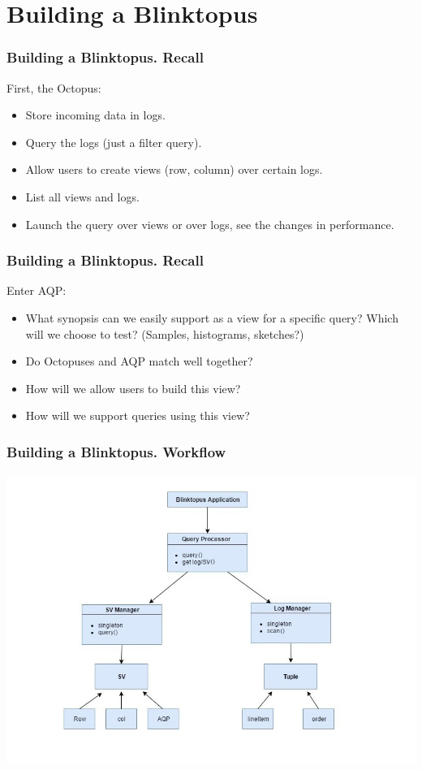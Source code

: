 \documentclass{beamer}
\begin{document}
\section{Building a Blinktopus}
\begin{frame}
\frametitle{Building a Blinktopus. Recall}
First, the Octopus:
\begin{itemize}
\item{Store incoming data in logs.}
\item{Query the logs (just a filter query).}
\item{Allow users to create views (row, column) over certain logs.}
\item{List all views and logs.}
\item{Launch the query over views or over logs, see the changes in performance.}
\end{itemize}
\end{frame}
\begin{frame}
\frametitle{Building a Blinktopus. Recall}
Enter AQP:
\begin{itemize}
\item{What synopsis can we easily support as a view for a specific query? Which will we choose to test? (Samples, histograms, sketches?)}
\item{Do Octopuses and AQP match well together?}
\item{How will we allow users to build this view?}
\item{How will we support queries using this view?}\\
\end{itemize}
\end{frame}


\begin{frame}
\frametitle{Building a Blinktopus. Workflow}
\includegraphics[scale=0.5]{img/workflow.jpg}
\end{frame}
\end{document}
